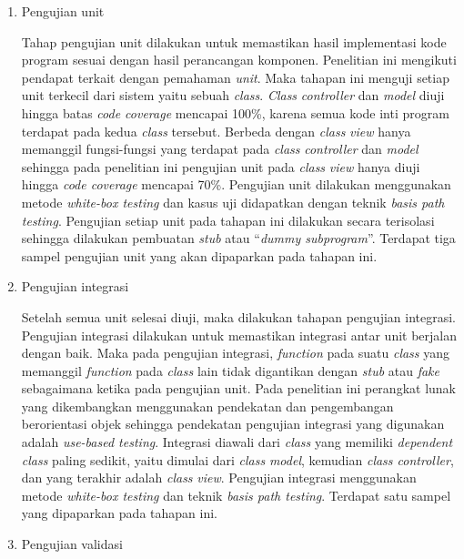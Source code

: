 \begin{enumerate}[
leftmargin=0pt, itemindent=20pt,
labelwidth=15pt, labelsep=5pt, listparindent=0.7cm,
align=left]

\item Pengujian unit

  Tahap pengujian unit dilakukan untuk memastikan hasil implementasi kode
  program sesuai dengan hasil perancangan komponen. Penelitian ini mengikuti
  pendapat \textcite{pressman2010software} terkait dengan pemahaman
  \emph{unit}. Maka tahapan ini menguji setiap unit terkecil dari sistem yaitu
  sebuah \emph{class}. \emph{Class} \emph{controller} dan \emph{model} diuji hingga
  batas \emph{code coverage} mencapai 100\%, karena semua kode inti program terdapat
  pada kedua \emph{class} tersebut. Berbeda dengan \emph{class} \emph{view} hanya
  memanggil fungsi-fungsi yang terdapat pada \emph{class} \emph{controller} dan
  \emph{model} sehingga pada penelitian ini pengujian unit pada \emph{class}
  \emph{view} hanya diuji hingga \emph{code coverage} mencapai 70\%. Pengujian unit
  dilakukan menggunakan metode \emph{white-box testing} dan kasus uji didapatkan
  dengan teknik \emph{basis path testing}. Pengujian setiap unit pada tahapan
  ini dilakukan secara terisolasi sehingga dilakukan pembuatan \emph{stub} atau
  ``\emph{dummy subprogram}''. Terdapat tiga sampel pengujian unit yang akan
  dipaparkan pada tahapan ini.

\item Pengujian integrasi

  Setelah semua unit selesai diuji, maka dilakukan tahapan pengujian
  integrasi. Pengujian integrasi dilakukan untuk memastikan integrasi antar unit
  berjalan dengan baik. Maka pada pengujian integrasi, \emph{function} pada
  suatu \emph{class} yang memanggil \emph{function} pada \emph{class} lain tidak
  digantikan dengan \emph{stub} atau \emph{fake} sebagaimana ketika pada
  pengujian unit. Pada penelitian ini perangkat lunak yang dikembangkan
  menggunakan pendekatan dan pengembangan berorientasi objek sehingga pendekatan pengujian
  integrasi yang digunakan adalah \emph{use-based testing}. Integrasi
  diawali dari \emph{class} yang memiliki \emph{dependent class} paling
  sedikit, yaitu dimulai dari \emph{class} \emph{model}, kemudian
  \emph{class controller}, dan yang terakhir adalah \emph{class}
  \emph{view}. Pengujian integrasi menggunakan metode \emph{white-box
    testing} dan teknik \emph{basis path testing}. Terdapat satu
  sampel yang dipaparkan pada tahapan ini.
\newpage %
\item Pengujian validasi


\end{enumerate}
